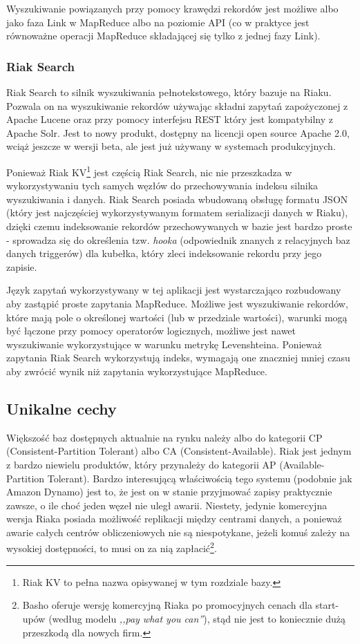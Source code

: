 Wyszukiwanie powiązanych przy pomocy krawędzi rekordów jest możliwe albo jako faza Link w MapReduce albo na poziomie API (co w praktyce jest równoważne operacji MapReduce składającej się tylko z jednej fazy Link).

\subsubsection*{Riak Search}

Riak Search to silnik wyszukiwania pełnotekstowego, który bazuje na Riaku. 
Pozwala on na wyszukiwanie rekordów używając składni zapytań zapożyczonej z Apache Lucene oraz przy pomocy interfejsu REST który jest kompatybilny z Apache Solr.
Jest to nowy produkt, dostępny na licencji open source Apache 2.0, wciąż jeszcze w wersji beta, ale jest już używany w systemach produkcyjnych.

Ponieważ Riak KV\footnote{Riak KV to pełna nazwa opisywanej w tym rozdziale bazy.} jest częścią Riak Search, nic nie przeszkadza w wykorzystywaniu tych samych węzłów do przechowywania indeksu silnika wyszukiwania i danych.
Riak Search posiada wbudowaną obsługę formatu JSON (który jest najczęściej wykorzystywanym formatem serializacji danych w Riaku), dzięki czemu indeksowanie rekordów przechowywanych w bazie jest bardzo proste - sprowadza się do określenia tzw. \emph{hooka} (odpowiednik znanych z relacyjnych baz danych triggerów) dla kubełka, który zleci indeksowanie rekordu przy jego zapisie.

Język zapytań wykorzystywany w tej aplikacji jest wystarczająco rozbudowany aby zastąpić proste zapytania MapReduce.
Możliwe jest wyszukiwanie rekordów, które mają pole o określonej wartości (lub w przedziale wartości), warunki mogą być łączone przy pomocy operatorów logicznych, możliwe jest nawet wyszukiwanie wykorzystujące w warunku metrykę Levenshteina.
Ponieważ zapytania Riak Search wykorzystują indeks, wymagają one znaczniej mniej czasu aby zwrócić wynik niż zapytania wykorzystujące MapReduce.

\subsection*{Unikalne cechy}

Większość baz dostępnych aktualnie na rynku należy albo do kategorii CP (Consistent-Partition Tolerant) albo CA (Consistent-Available).
Riak jest jednym z bardzo niewielu produktów, który przynależy do kategorii AP (Available-Partition Tolerant).
Bardzo interesującą właściwością tego systemu (podobnie jak Amazon Dynamo) jest to, że jest on w stanie przyjmować zapisy praktycznie zawsze, o ile choć jeden węzeł nie uległ awarii.
Niestety, jedynie komercyjna wersja Riaka posiada możliwość replikacji między centrami danych, a ponieważ awarie całych centrów obliczeniowych nie są niespotykane, jeżeli komuś zależy na wysokiej dostępności, to musi on za nią zapłacić\footnote{Basho oferuje wersję komercyjną Riaka po promocyjnych cenach dla start-upów (według modelu \emph{,,pay what you can''}), stąd nie jest to koniecznie dużą przeszkodą dla nowych firm.}.

